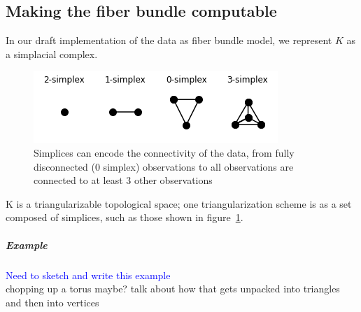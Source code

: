 \documentclass[../main.tex]{subfiles}
\begin{document}
\subsection{Making the fiber bundle computable}
\label{sec:triangulization}
In our draft implementation of the data as fiber bundle model, we represent $K$ as a simplacial complex. 

\begin{figure}[H]
    \label{fig:simplex}
    \includegraphics{figures/math/simplex.png}
    \caption{Simplices can encode the connectivity of the data, from fully disconnected (0 simplex) observations to all observations are connected to at least 3 other observations}
\end{figure}

K is a triangularizable topological space; one triangularization scheme is as a set composed of simplices\cite{geometricaSimplicialComplexes}, such as those shown in figure~\ref{fig:simplex}.

\subparagraph{Example}
\textcolor{blue}{Need to sketch and write this example}\\
chopping up a torus maybe? talk about how that gets unpacked into triangles and then into vertices
\end{document}
